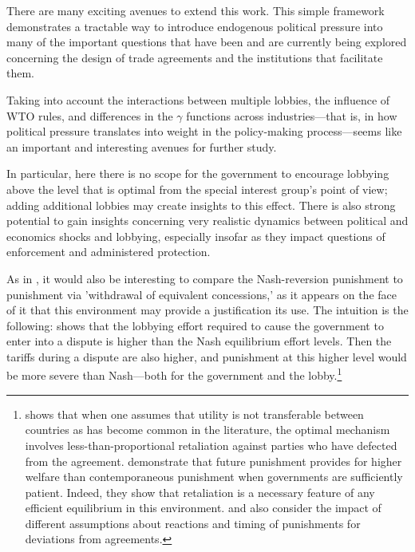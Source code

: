 \documentclass[12pt,titlepage]{article}
\newcommand{\ga}{\gamma}
\begin{document}
There are many exciting avenues to extend this work. This simple framework demonstrates a tractable way to introduce endogenous political pressure into many of the important questions that have been and are currently being explored concerning the design of trade agreements and the institutions that facilitate them.


Taking into account the interactions between multiple lobbies, the influence of WTO rules, and differences in the $\ga$ functions across industries---that is, in how political pressure translates into weight in the policy-making process---seems like an important and interesting avenues for further study.

In particular, here there is no scope for the government to encourage lobbying above the level that is optimal from the special interest group's point of view; adding additional lobbies may create insights to this effect. There is also strong potential to gain insights concerning very realistic dynamics between political and economics shocks and lobbying, especially insofar as they impact questions of enforcement and administered protection.

As in \Textcite{zissimos}, it would also be interesting to compare the Nash-reversion punishment to punishment via 'withdrawal of equivalent concessions,' as it appears on the face of it that this environment may provide a justification its use. The intuition is the following: \Textcite{buzard2013a} shows that the lobbying effort required to cause the government to enter into a dispute is higher than the Nash equilibrium effort levels. Then the tariffs during a dispute are also higher, and punishment at this higher level would be more severe than Nash---both for the government and the lobby.\footnote{\Textcite{beshkar2010a} shows that when one assumes that utility is not transferable between countries as has become common in the literature, the optimal mechanism involves less-than-proportional retaliation against parties who have defected from the agreement. \Textcite{martinvergote} demonstrate that future punishment provides for higher welfare than contemporaneous punishment when governments are sufficiently patient. Indeed, they show that retaliation is a necessary feature of any efficient equilibrium in this environment. \Textcite{hungerford} and \Textcite{riezman1991} also consider the impact of different assumptions about reactions and timing of punishments for deviations from agreements.}
\end{document}
